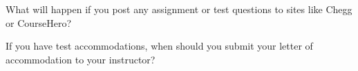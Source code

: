 \documentclass{exam}
\numberwithin{equation}{section} %
\numberwithin{figure}{section} %
\numberwithin{table}{section} %
\begin{document}
\begin{questions}
\begin{solution}[\stretch{2}]
\end{solution}

\question What will happen if you post any assignment or test questions to sites like Chegg or CourseHero?
\begin{solution}[\stretch{1}]

\end{solution}

\question If you have test accommodations, when should you submit your letter of accommodation to your instructor?
\begin{solution}[\stretch{1}]

\end{solution}

\end{questions}
\end{document}
